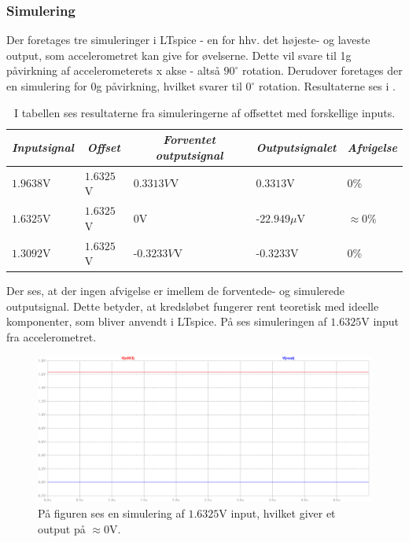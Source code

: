 \subsubsection{Simulering}
Der foretages tre simuleringer i LTspice - en for hhv. det højeste- og laveste output, som accelerometret kan give for øvelserne. Dette vil svare til 1g påvirkning af accelerometerets x akse - altså $90^{\circ}$ rotation. Derudover foretages der en simulering for 0g påvirkning, hvilket svarer til $0^{\circ}$ rotation. Resultaterne ses i .
\begin{table}[H]
	\centering
	\begin{tabular}{|l|l|l|l|l|}
		\hline
		\multicolumn{1}{|c|}{\textit{Inputsignal}} & \multicolumn{1}{c|}{\textit{Offset}} & \multicolumn{1}{c|}{\textit{Forventet outputsignal}} & \multicolumn{1}{c|}{\textit{Outputsignalet}} & \multicolumn{1}{c|}{\textit{Afvigelse}} \\ \hline
		$1.9638$V     & $1.6325$V    & $0.3313V$V    & $0.3313$V       & $0$\%              \\ \hline
		$1.6325$V     & $1.6325$V    & $0$V          & -$22.949\mu$V   & $\approx 0$\%      \\ \hline
		$1.3092$V     & $1.6325$V    & -$0.3233V$V   & -$0.3233$V      & $0$\%                \\ \hline
	\end{tabular}
	\caption{I tabellen ses resultaterne fra simuleringerne af offsettet med forskellige inputs.}
	\label{Tab:offset_sim}
\end{table}
\noindent Der ses, at der ingen afvigelse er imellem de forventede- og simulerede outputsignal. Dette betyder, at kredsløbet fungerer rent teoretisk med ideelle komponenter, som bliver anvendt i LTspice. På  ses simuleringen af $1.6325$V input fra accelerometret.
 
\begin{figure}[H]
\centering
\includegraphics[scale=0.3]{figures/cProblemloesning/Offset_simulering.png}
\caption{På figuren ses en simulering af $1.6325$V input, hvilket giver et output på $\approx 0$V.}
\label{fig:Offset_simulering}
\end{figure}

